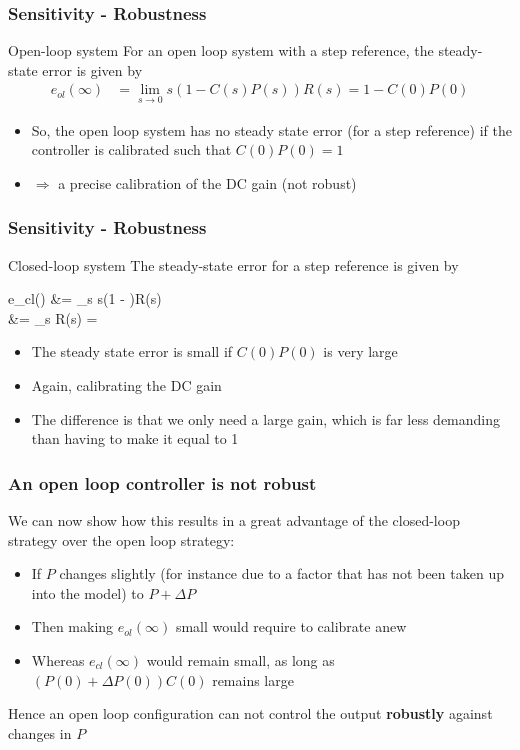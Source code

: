 \begin{frame}
	\frametitle{Sensitivity - Robustness}
	\begin{block}{Open-loop system}	
		For an open loop system with a step reference, the steady-state error is given by
		\begin{align*}
			e_{ol}(\infty) &= \lim\limits_{s \rightarrow 0}
			s(1 - C(s)P(s))R(s) = 1 - C(0)P(0)
		\end{align*}
		\vspace{-1em}
		\begin{itemize}
			\item So, the open loop system has no steady state error (for a step reference) if the controller is calibrated such that $C(0)P(0)=1$
			\item $\Rightarrow$ a precise calibration of the DC gain (not robust)
		\end{itemize}
	\end{block}
\end{frame}


\begin{frame}
	\frametitle{Sensitivity - Robustness}
	\begin{block}{Closed-loop system}
		The steady-state error for a step reference is given by
		\begin{flalign*}
			e_{cl}(\infty) &= \lim\limits_{s } s\left(1 - \right)R(s) \\
			&= \lim\limits_{s } R(s) = 
		\end{flalign*}
		\begin{itemize}
			\item The steady state error is small if $C(0)P(0)$ is very large
			\item Again, calibrating the DC gain
			\item The difference is that we only need a large gain, which is far less demanding than having to make it equal to 1
		\end{itemize}
	\end{block}
\end{frame}

\begin{frame}
	\frametitle{An open loop controller is not robust}
	\begin{block}{}
		We can now show how this results in a great advantage of the closed-loop strategy over the open loop strategy:
		\begin{itemize}
			\item If $P$ changes slightly (for instance due to a factor that has not been taken up into the model) to $P+\Delta P$
			\item Then making $e_{ol}(\infty)$ small would require to calibrate anew
			\item Whereas $e_{cl} (\infty)$ would remain small, as long as $(P(0)+\Delta P(0))C(0)$ remains large
			
		\end{itemize}
		Hence an open loop configuration can not control the output \textbf{robustly} against changes in $P$
	\end{block}
\end{frame}

